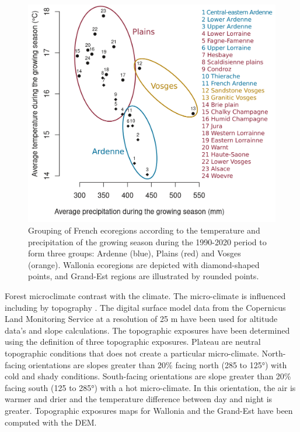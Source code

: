 \documentclass[3p,procedia]{elsarticle}
\begin{document}
\begin{figure}[htbp] 
	\centering
	\includegraphics[width=0.8\linewidth]{climat/climat_region.png}
	\caption{Grouping of French ecoregions according to the temperature and precipitation of the growing season during the 1990-2020 period to form three groups: Ardenne (blue), Plains (red) and Vosges (orange). Wallonia ecoregions are depicted with diamond-shaped points, and Grand-Est regions are illustrated by rounded points.}
	\label{fig:clim}
\end{figure}

Forest microclimate contrast with the climate.
The micro-climate is influenced including by topography \citep{de_frenne_forest_2021}.
The digital surface model data from the Copernicus Land Monitoring Service \citep{DEM_copernicus} at a resolution of 25 m have been used for altitude data's and slope calculations.
The topographic exposures have been determined using the \cite{Delvaux_galoux} definition of three topographic  exposures.
Plateau are neutral topographic conditions that does not create a particular micro-climate. 
North-facing orientations are slopes greater than  20\% facing north (285 to 125°) with cold and shady conditions.
South-facing orientations are slope greater than  20\% facing south (125 to 285°) with a hot micro-climate.
In this orientation, the air is warmer and drier and the temperature difference between day and night is greater.
Topographic exposures maps for Wallonia and the Grand-Est have been computed with the DEM. 
\end{document}
